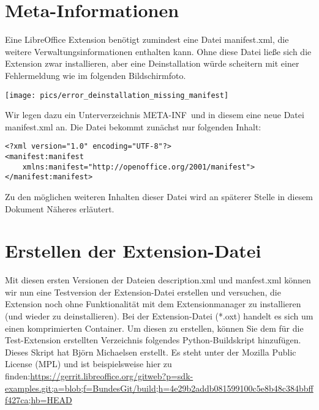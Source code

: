 \documentclass[a4paper,10pt,pagesize,titlepage]{scrbook}
\begin{document}
\section{Meta-Informationen}

Eine LibreOffice Extension benötigt zumindest eine Datei \glqq manifest.xml\grqq, die weitere Verwaltungsinformationen enthalten kann. Ohne diese Datei ließe sich die Extension zwar installieren, aber eine Deinstallation würde scheitern mit einer Fehlermeldung wie im folgenden Bildschirmfoto.
\begin{center}
	\captionsetup{type=figure}
\texttt{[image: pics/error\_deinstallation\_missing\_manifest]}
\label{fig:error_deinstallation_missing_manifest}
\end{center}

Wir legen dazu ein Unterverzeichnis \glqq META-INF\grqq~und in diesem eine neue Datei manifest.xml an. Die Datei bekommt zunächst nur folgenden Inhalt:
\newpage
\begin{lstlisting}
<?xml version="1.0" encoding="UTF-8"?>
<manifest:manifest 
    xmlns:manifest="http://openoffice.org/2001/manifest">
</manifest:manifest>
\end{lstlisting}

Zu den möglichen weiteren Inhalten dieser Datei wird an späterer Stelle in diesem Dokument Näheres erläutert.



\section{Erstellen der Extension-Datei}\label{extensiondateierstellen}

Mit diesen ersten Versionen der Dateien description.xml und manfest.xml können wir nun eine Testversion der Extension-Datei erstellen und versuchen, die Extension noch ohne Funktionalität mit dem Extensionmanager zu installieren (und wieder zu deinstallieren).
Bei der Extension-Datei (*.oxt) handelt es sich um einen komprimierten Container. Um diesen zu erstellen, können Sie dem für die Test-Extension erstellten Verzeichnis folgendes Python-Buildskript hinzufügen. Dieses Skript hat Björn Michaelsen erstellt. Es steht unter der Mozilla Public License (MPL) und ist beispielsweise hier zu finden:\linebreak \url{https://gerrit.libreoffice.org/gitweb?p=sdk-examples.git;a=blob;f=BundesGit/build;h=4e29b2addb081599100c5e8b48c384bbfff427ca;hb=HEAD}
\end{document}
